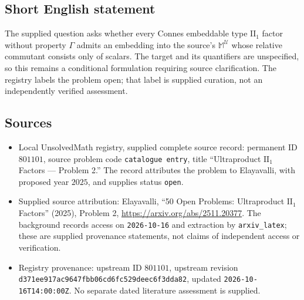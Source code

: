 \documentclass[11pt]{article}
\begin{document}
\subsection{Short English statement}
The supplied question asks whether every Connes embeddable type \(\mathrm{II}_1\) factor without property \(\Gamma\) admits an embedding into the source's \(\mathbb M^{\mathcal U}\) whose relative commutant consists only of scalars. The target and its quantifiers are unspecified, so this remains a conditional formulation requiring source clarification. The registry labels the problem open; that label is supplied curation, not an independently verified assessment.
\subsection{Sources}
\begin{itemize}
\item Local UnsolvedMath registry, supplied complete source record: permanent ID \(801101\), source problem code \texttt{catalogue entry}, title ``Ultraproduct \(\mathrm{II}_1\) Factors --- Problem 2.'' The record attributes the problem to Elayavalli, with proposed year \(2025\), and supplies status \texttt{open}.
\item Supplied source attribution: Elayavalli, ``50 Open Problems: Ultraproduct \(\mathrm{II}_1\) Factors'' (2025), Problem 2, \url{https://arxiv.org/abs/2511.20377}. The background records access on \texttt{2026-10-16} and extraction by \texttt{arxiv\_latex}; these are supplied provenance statements, not claims of independent access or verification.
\item Registry provenance: upstream ID \(801101\), upstream revision \texttt{d371ee917ac9647fbb06cd6fc529deec6f3dda82}, updated \texttt{2026-10-16T14:00:00Z}. No separate dated literature assessment is supplied.
\end{itemize}
\end{document}
